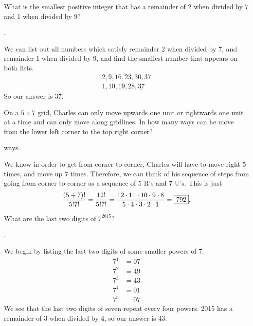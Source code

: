 \documentclass[11pt]{article}
\DeclareRobustCommand{\frac}[3][0pt]{%
  {\begingroup\hspace{#1}#2\hspace{#1}\endgroup\over\hspace{#1}#3\hspace{#1}}}
\begin{document}
\begin{problem}What is the smallest positive integer that has a remainder of 2 when divided by 7 and 1 when divided by 9?
\end{problem}
\begin{answer}
.
\end{answer}
\begin{solution}
We can list out all numbers which satisfy remainder 2 when divided by 7, and remainder 1 when divided by 9, and find the smallest number that appears on both lists.
\begin{align*}
2, 9, 16, 23, 30, \underline{37} \\
1, 10, 19, 28, \underline{37}
\end{align*}
So our answer is $\boxed{37}$.
\end{solution}

\begin{problem}
On a $5 \times 7$ grid, Charles can only move upwards one unit or rightwards one unit at a time and can only move along gridlines.
In how many ways can he move from the lower left corner to the top right corner?
\end{problem}
\begin{answer}
 ways.
\end{answer}
\begin{solution}
We know in order to get from corner to corner, Charles will have to move right 5 times, and move up 7 times. Therefore, we can think of his sequence of steps from going from corner to corner as a sequence of 5 R's and 7 U's. This is just
$$\frac{(5+7)!}{5!7!}=\frac{12!}{5!7!} = \frac{12 \cdot 11 \cdot 10 \cdot 9 \cdot 8}{5 \cdot 4 \cdot 3 \cdot 2 \cdot 1} = \boxed{792}.$$
\end{solution}

\begin{problem}What are the last two digits of $7^{2015}$?
\end{problem}
\begin{answer}
.
\end{answer}
\begin{solution}
We begin by listing the last two digits of some smaller powers of 7.
\begin{align*}
7^1 &= 07 \\
7^2 &= 49 \\
7^3 &= 43 \\
7^4 &= 01 \\
7^5 &= 07
\end{align*}
We see that the last two digits of seven repeat every four powers. 2015 has a remainder of 3 when divided by 4, so our answer is $\boxed{43}$.
\end{solution}
\end{document}
